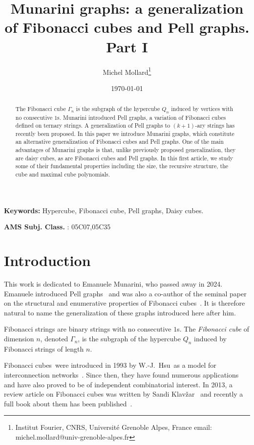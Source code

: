 \documentclass[11pt]{article}
\begin{document}
\title{Munarini graphs: a generalization of Fibonacci cubes and Pell graphs. Part I}

\author{
Michel Mollard\footnote{Institut Fourier, CNRS, Universit\'e Grenoble Alpes, France email: michel.mollard@univ-grenoble-alpes.fr}
}
\date{\today}
\maketitle

\begin{abstract}
The Fibonacci cube $\Gamma_n$ is the subgraph of the hypercube $Q_n$ induced by vertices with no consecutive $1$s. Munarini introduced Pell graphs, a variation of Fibonacci cubes defined on ternary strings.  A generalization of  Pell graphs to $(k+1)$-ary strings has recently been proposed. In this paper we introduce Munarini graphs, which constitute an alternative  generalization of Fibonacci cubes and  Pell graphs. One of the main advantages of Munarini graphs is that, unlike previously proposed generalization, they are daisy cubes, as are Fibonacci cubes and  Pell graphs. In this first article, we  study some of their fundamental properties including the size, the recursive structure,  the cube  and  maximal cube polynomials.

\end{abstract}
\noindent
{\bf Keywords:} Hypercube, Fibonacci cube, Pell graphs, Daisy cubes. 

\noindent
{\bf AMS Subj. Class. }: 05C07,05C35

\section{Introduction }

This work is dedicated to Emanuele Munarini, who passed away in 2024. Emanuele introduced Pell graphs~\cite{M-2019} and was also a co-author of the seminal paper on the structural and enumerative properties of Fibonacci cubes~\cite{MZ-2002}. It is therefore natural to name the generalization of these graphs introduced here after him.

Fibonacci strings are binary strings with no consecutive $1$s.    
The {\em Fibonacci cube} of dimension $n$, denoted $\Gamma_n$, is the subgraph of the hypercube $Q_n$  induced by Fibonacci strings of length $n$. 

Fibonacci cubes\ were introduced in 1993 by W.-J.~Hsu\ as a model for interconnection networks~\cite{H-1993a}. Since then, they have found numerous applications and have also proved to be of independent combinatorial interest. In 2013, a review article on Fibonacci cubes was written by 
Sandi Klav\v{z}ar~\cite{K-2013a} and recently a full book about them has been published~\cite{EKM-2023}.
\end{document}
